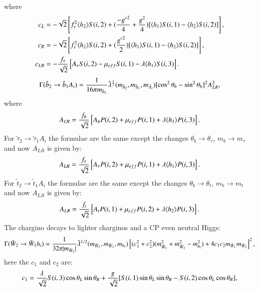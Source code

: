 \documentclass[final,3p,times,pdflatex]{elsarticle}
\begin{document}
where
\begin{align}
c_{L} &= -\sqrt{2}\left[f_{\tau}^2 \langle h_2 \rangle S(i,2) + ({-{g'}^2 \over 4} + {g^2 \over 4})[\langle h_1 \rangle S(i,1) - \langle h_{2} \rangle S(i,2)]\right], \\
c_{R} &= -\sqrt{2}\left[f_{\tau}^2 \langle h_2 \rangle S(i,2) + ({{g'}^2 \over 2})[\langle h_1 \rangle S(i,1) - \langle h_{2} \rangle S(i,2)]\right], \\
c_{LR} &= -{f_{\tau} \over \sqrt{2}}\left[A_{\tau}S(i,2) - \mu_{eff}S(i,1)-\lambda \langle h_{1} \rangle S(i,3)\right].
\end{align}
\begin{equation} \label{sb2sb1ANMSSM}
\Gamma(\tilde{b}_2 \rightarrow \tilde{b}_1 A_{i}) = {1 \over 16 \pi m_{\tilde{b}_2}} \tilde{\lambda}^{1 \over 2}(m_{\tilde{b}_2},m_{\tilde{b}_1},m_{\tilde{A}_i})[\cos^2 \theta_b - \sin^2 \theta_b]^2 A_{LR}^2,
\end{equation}
where
\begin{equation}
A_{LR} = {f_{b} \over \sqrt{2}} \left[A_{b}P(i,2) + \mu_{eff} P(i,1) + \lambda \langle h_{1} \rangle P(i,3)\right].
\end{equation}
For $\tilde{\tau}_2 \rightarrow \tilde{\tau}_1 A_{i}$ the formulae are the same except the changes $\theta_{b} \rightarrow \theta_{\tau}$, $m_b \rightarrow m_{\tau}$ and now $A_{LR}$ is given by:
\begin{equation}
A_{LR} = {f_{\tau} \over \sqrt{2}}\left[A_{\tau}P(i,2) + \mu_{eff}P(i,1) + \lambda \langle h_{1} \rangle P(i,3)\right].
\end{equation}
For $\tilde{t}_2 \rightarrow \tilde{t}_1 A_{i}$ the formulae are the same except the changes $\theta_b \rightarrow \theta_t$, $m_b \rightarrow m_t$ and now $A_{LR}$ is given by:
\begin{equation}
A_{LR} = {f_{t} \over \sqrt{2}}\left[A_{t}P(i,1) + \mu_{eff}P(i,2) + \lambda \langle h_{2} \rangle P(i,3)\right].
\end{equation}
The chargino decays to lighter charginos and a CP even neutral Higgs:
\begin{equation} \label{ch2ch1hNMSSM}
\Gamma(\tilde{W}_2 \rightarrow \tilde{W}_1 h_{i}) = {1 \over 32 \pi |m_{\tilde{W}_2}|} \tilde{\lambda}^{1/2}
(m_{\tilde{W}_2},m_{\tilde{W}_1},m_{h_i})\left[(c_{1}^2 + c_{2}^2)(m_{\tilde{W}_1}^2 + m_{\tilde{W}_2}^2 - m_{h_i}^2) + 4c_{1} c_{2} m_{\tilde{W}_1} m_{\tilde{W}_2}\right]^2,
\end{equation}
here the $c_{1}$ and $c_{2}$ are:
\begin{equation}
c_{1} = {\lambda \over \sqrt{2}}S(i,3)\cos\theta_L \sin\theta_R + {g \over \sqrt{2}}[S(i,1)\sin\theta_L \sin\theta_R - S(i,2) \cos\theta_L \cos\theta_R],
\end{equation}
\end{document}
